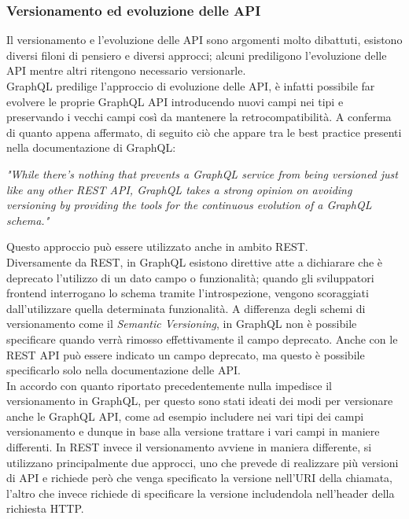 \subsubsection*{Versionamento ed evoluzione delle API}
Il versionamento e l'evoluzione delle API sono argomenti molto dibattuti, esistono diversi filoni di pensiero e diversi approcci; alcuni prediligono l'evoluzione delle API mentre altri ritengono necessario versionarle.\\
GraphQL predilige l'approccio di evoluzione delle API, è infatti possibile far evolvere le proprie GraphQL API introducendo nuovi campi nei tipi e preservando i vecchi campi così da mantenere la retrocompatibilità. A conferma di quanto appena affermato, di seguito ciò che appare tra le best practice presenti nella documentazione di GraphQL:
\begin{quoting}
  \textit{"While there’s nothing that prevents a GraphQL service from being versioned just like any other REST API, GraphQL takes a strong opinion on avoiding versioning by providing the tools for the continuous evolution of a GraphQL schema."}
\end{quoting}
Questo approccio può essere utilizzato anche in ambito REST.\\
Diversamente da REST, in GraphQL esistono direttive atte a dichiarare che è deprecato l'utilizzo di un dato campo o funzionalità; quando gli sviluppatori frontend interrogano lo schema tramite l'introspezione, vengono scoraggiati dall'utilizzare quella determinata funzionalità. A differenza degli schemi di versionamento come il \textit{Semantic Versioning}, in GraphQL non è possibile specificare quando verrà rimosso effettivamente il campo deprecato. Anche con le REST API può essere indicato un campo deprecato, ma questo è possibile specificarlo solo nella documentazione delle API.\\
In accordo con quanto riportato precedentemente nulla impedisce il versionamento in GraphQL, per questo sono stati ideati dei modi per versionare anche le GraphQL API, come ad esempio includere nei vari tipi dei campi versionamento e dunque in base alla versione trattare i vari campi in maniere differenti. In REST invece il versionamento avviene in maniera differente, si utilizzano principalmente due approcci, uno che prevede di realizzare più versioni di API e richiede però che venga specificato la versione nell'URI della chiamata, l'altro che invece richiede di specificare la versione includendola nell'header della richiesta HTTP.
